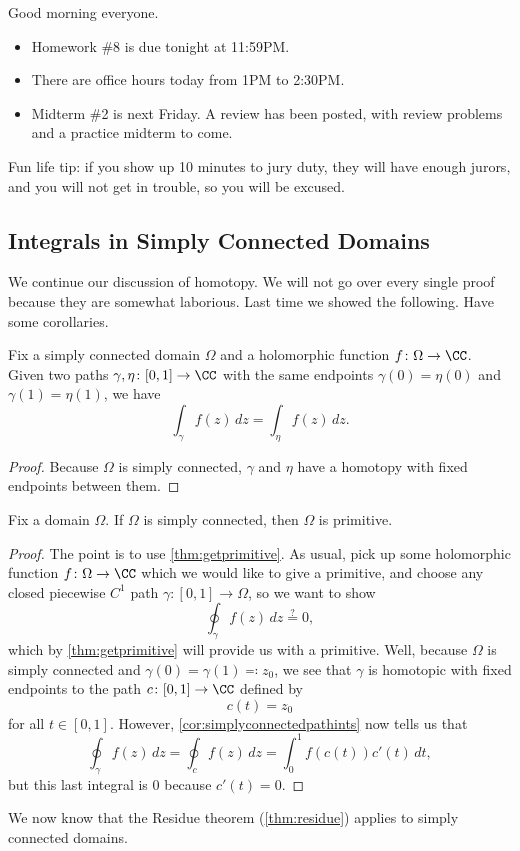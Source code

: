 
Good morning everyone.
\begin{itemize}
	\item Homework \#8 is due tonight at 11:59PM.
	\item There are office hours today from 1PM to 2:30PM.
	\item Midterm \#2 is next Friday. A review has been posted, with review problems and a practice midterm to come.
\end{itemize}
\begin{remark}[Morrow]
	Fun life tip: if you show up 10 minutes to jury duty, they will have enough jurors, and you will not get in trouble, so you will be excused.
\end{remark}

\subsection{Integrals in Simply Connected Domains}
We continue our discussion of homotopy. We will not go over every single proof because they are somewhat laborious. Last time we showed the following.
\homoind*
\noindent Have some corollaries.
\begin{corollary} \label{cor:simplyconnectedpathints}
	Fix a simply connected domain $\Omega$ and a holomorphic function $f\colon \Omega\to\CC$. Given two paths $\gamma,\eta\colon [0,1]\to\CC$ with the same endpoints $\gamma(0)=\eta(0)$ and $\gamma(1)=\eta(1)$, we have
	\[\int_\gamma f(z)\,dz=\int_\eta f(z)\,dz.\]
\end{corollary}
\begin{proof}
	Because $\Omega$ is simply connected, $\gamma$ and $\eta$ have a homotopy with fixed endpoints between them.
\end{proof}
\begin{corollary} \label{cor:simpconnisprimitive}
	Fix a domain $\Omega$. If $\Omega$ is simply connected, then $\Omega$ is primitive.
\end{corollary}
\begin{proof}
	The point is to use \autoref{thm:getprimitive}. As usual, pick up some holomorphic function $f\colon \Omega\to\CC$ which we would like to give a primitive, and choose any closed piecewise $C^1$ path $\gamma\colon [0,1]\to\Omega$, so we want to show
	\[\oint_\gamma f(z)\,dz\stackrel?=0,\]
	which by \autoref{thm:getprimitive} will provide us with a primitive. Well, because $\Omega$ is simply connected and $\gamma(0)=\gamma(1)\eqqcolon z_0$, we see that $\gamma$ is homotopic with fixed endpoints to the path $c\colon [0,1]\to\CC$ defined by
	\[c(t)=z_0\]
	for all $t\in[0,1]$. However, \autoref{cor:simplyconnectedpathints} now tells us that
	\[\oint_\gamma f(z)\,dz=\oint_c f(z)\,dz=\int_0^1f(c(t))c'(t)\,dt,\]
	but this last integral is $0$ because $c'(t)=0$.
\end{proof}
\begin{example}
	We now know that the Residue theorem (\autoref{thm:residue}) applies to simply connected domains.
\end{example}

